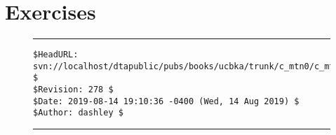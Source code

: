 \section{Exercises}



\noindent\begin{figure}[!b]
\noindent\rule[-0.25in]{\textwidth}{1pt}
\begin{tiny}
\begin{verbatim}
$HeadURL: svn://localhost/dtapublic/pubs/books/ucbka/trunk/c_mtn0/c_mtn0.tex $
$Revision: 278 $
$Date: 2019-08-14 19:10:36 -0400 (Wed, 14 Aug 2019) $
$Author: dashley $
\end{verbatim}
\end{tiny}
\noindent\rule[0.25in]{\textwidth}{1pt}
\end{figure}

%
